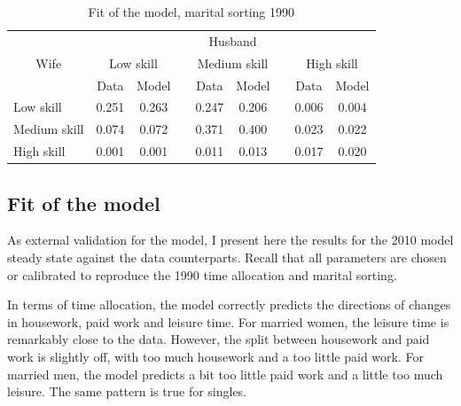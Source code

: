 \documentclass[12pt]{article}
\begin{document}
\begin{table}[]
	\centering
	\caption{Fit of the model, marital sorting 1990}
	\begin{tabular}{lcccccccc}
		\toprule
		\multicolumn{1}{c}{\multirow{3}[6]{*}{Wife}} & \multicolumn{8}{c}{Husband} \\
		\cmidrule{2-9}          & \multicolumn{2}{c}{Low skill} &       & \multicolumn{2}{c}{Medium skill} &       & \multicolumn{2}{c}{High skill} \\
		\cmidrule{2-3}\cmidrule{5-6}\cmidrule{8-9}          & Data  & Model &       & Data  & Model &       & Data  & Model \\
		\midrule
		Low skill & 0.251 & 0.263 &       & 0.247 & 0.206 &       & 0.006 & 0.004 \\
		Medium skill & 0.074 & 0.072 &       & 0.371 & 0.400 &       & 0.023 & 0.022 \\
		High skill & 0.001 & 0.001 &       & 0.011 & 0.013 &       & 0.017 & 0.020 \\
		\bottomrule
		\bottomrule
	\end{tabular}
	\label{tab:ms_results_1990}
\end{table}

\subsection{Fit of the model}

As external validation for the model, I present here the results for the 2010 model steady state against the data counterparts. Recall that all parameters are chosen or calibrated to reproduce the 1990 time allocation and marital sorting. 

In terms of time allocation, the model correctly predicts the directions of changes in housework, paid work and leisure time. For married women, the leisure time is remarkably close to the data. However, the split between housework and paid work is slightly off, with too much housework and a too little paid work. For married men, the model predicts a bit too little paid work and a little too much leisure. The same pattern is true for singles.
\end{document}
